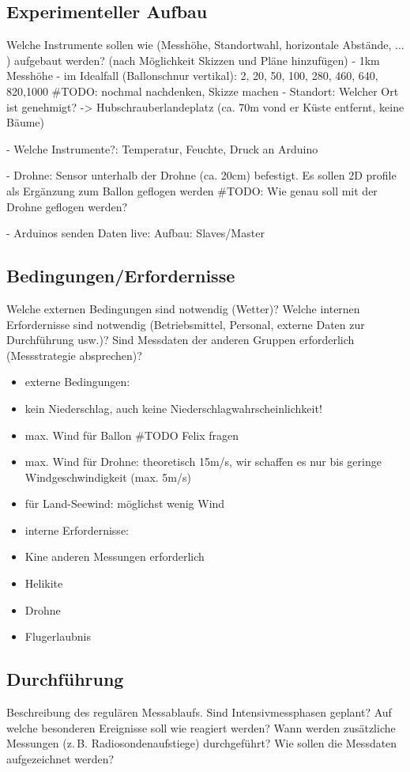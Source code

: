 \documentclass[a4paper,11pt,DIV=calc,tablecaptionabove,headinclude,twoside]{article}
\begin{document}
\subsection{Experimenteller Aufbau}
Welche Instrumente sollen wie (Messhöhe, Standortwahl, horizontale Abstände, ... ) aufgebaut werden? (nach Möglichkeit Skizzen und Pläne hinzufügen)
- 1km Messhöhe
- im Idealfall (Ballonschnur vertikal): 2, 20, 50, 100, 280, 460, 640, 820,1000 #TODO: nochmal nachdenken, Skizze machen
- Standort: Welcher Ort ist genehmigt? -> Hubschrauberlandeplatz (ca. 70m vond er Küste entfernt, keine Bäume)

- Welche Instrumente?: Temperatur, Feuchte, Druck an Arduino

- Drohne: Sensor unterhalb der Drohne (ca. 20cm) befestigt. Es sollen 2D profile als Ergänzung zum Ballon geflogen werden #TODO: Wie genau soll mit der Drohne geflogen werden?

- Arduinos senden Daten live: Aufbau: Slaves/Master
\subsection{Bedingungen/Erfordernisse}
Welche externen Bedingungen sind notwendig (Wetter)? Welche internen Erfordernisse sind notwendig (Betriebsmittel, Personal, externe Daten zur Durchführung usw.)? Sind Messdaten der anderen Gruppen erforderlich (Messstrategie absprechen)?


\begin{itemize}
\item externe Bedingungen:
	\item kein Niederschlag, auch keine Niederschlagwahrscheinlichkeit!
	\item max. Wind für Ballon #TODO Felix fragen
	\item max. Wind für Drohne: theoretisch 15m/s, wir schaffen es nur bis geringe Windgeschwindigkeit (max. 5m/s)
	\item für Land-Seewind: möglichst wenig Wind\\
	
\item interne Erfordernisse:
	\item Kine anderen Messungen erforderlich
	\item Helikite
	\item Drohne
	\item Flugerlaubnis
\end{itemize}

\subsection{Durchführung}
Beschreibung des regulären Messablaufs. Sind Intensivmessphasen geplant? Auf welche besonderen Ereignisse soll wie reagiert werden? 
Wann werden zusätzliche Messungen (z.\,B. Radiosondenaufstiege) durchgeführt?
Wie sollen die Messdaten aufgezeichnet werden? 
\end{document}
